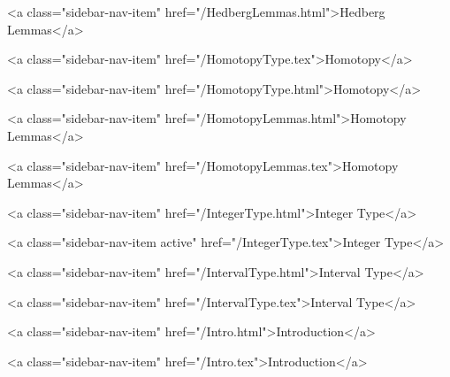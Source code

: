       
        
          <a class="sidebar-nav-item" href="/HedbergLemmas.html">Hedberg Lemmas</a>
        
      
    
      
        
          <a class="sidebar-nav-item" href="/HomotopyType.tex">Homotopy</a>
        
      
    
      
        
          <a class="sidebar-nav-item" href="/HomotopyType.html">Homotopy</a>
        
      
    
      
        
          <a class="sidebar-nav-item" href="/HomotopyLemmas.html">Homotopy Lemmas</a>
        
      
    
      
        
          <a class="sidebar-nav-item" href="/HomotopyLemmas.tex">Homotopy Lemmas</a>
        
      
    
      
        
          <a class="sidebar-nav-item" href="/IntegerType.html">Integer Type</a>
        
      
    
      
        
          <a class="sidebar-nav-item active" href="/IntegerType.tex">Integer Type</a>
        
      
    
      
        
          <a class="sidebar-nav-item" href="/IntervalType.html">Interval Type</a>
        
      
    
      
        
          <a class="sidebar-nav-item" href="/IntervalType.tex">Interval Type</a>
        
      
    
      
        
          <a class="sidebar-nav-item" href="/Intro.html">Introduction</a>
        
      
    
      
        
          <a class="sidebar-nav-item" href="/Intro.tex">Introduction</a>
        
      
    
